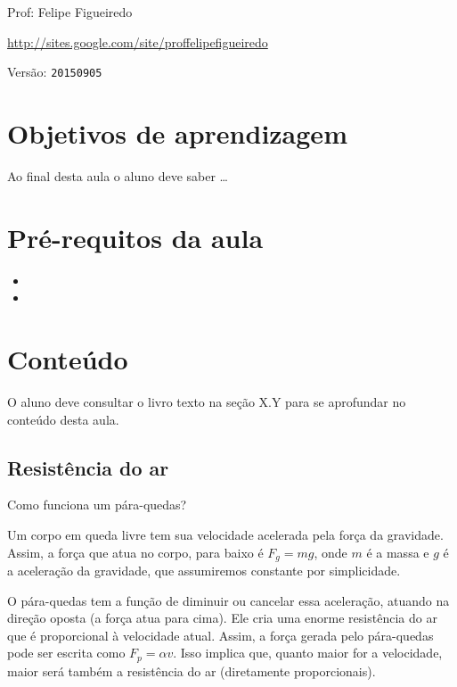\documentclass[a4paper]{article}
\begin{document}
\parbox[c]{.825\textwidth}{\raggedright%
{Prof: Felipe Figueiredo\par}
{\url{http://sites.google.com/site/proffelipefigueiredo}\par}
}

Versão: \verb|20150905|



\section{Objetivos de aprendizagem}

Ao final desta aula o aluno deve saber \ldots


\section{Pré-requitos da aula}

\begin{itemize}
\item 
\item 
\end{itemize}

\section{Conteúdo}

O aluno deve consultar o livro texto na seção X.Y para se aprofundar
no conteúdo desta aula.


\subsection{Resistência do ar}

Como funciona um pára-quedas?

Um corpo em queda livre tem sua velocidade acelerada pela força da
gravidade. Assim, a força que atua no corpo, para baixo é $F_g=mg$, onde
$m$ é a massa e $g$ é a aceleração da gravidade, que assumiremos
constante por simplicidade.

O pára-quedas tem a função de diminuir ou cancelar essa aceleração,
atuando na direção oposta (a força atua para cima). Ele cria uma
enorme resistência do ar que é {\rm proporcional} à velocidade
atual. Assim, a força gerada pelo pára-quedas pode ser escrita como
$F_p=\alpha v$. Isso implica que, quanto maior for a velocidade, maior
será também a resistência do ar (diretamente proporcionais).
\end{document}
